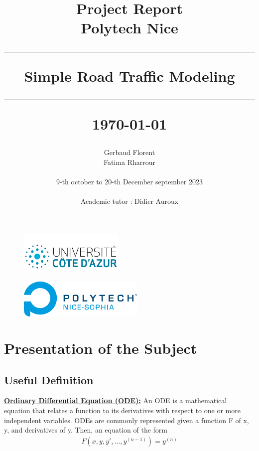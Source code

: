 \documentclass{article}
\title{\textbf{\Huge Project Report}\\[1cm]
	\textbf{\LARGE Polytech Nice}\\[2cm]
	\hrule height 1pt
	\vspace{0.5cm}
	\textbf{\Large Simple Road Traffic Modeling}\\[0.5cm]
	\hrule height 1pt
	\vspace{3cm}
	\small{\today{}}}
\author{
	\begin{tabular}{c}
		Gerbaud Florent \\ Fatima Rharrour \\ \\
		9-th october to 20-th December september 2023\\
		\\ Academic tutor : Didier Auroux
	\end{tabular}
}
\date{}
\begin{document}
	\maketitle
	\hspace{2cm}
	\begin{figure}[b]
		\centering
		\begin{minipage}[b]{0.45\linewidth}
			\includegraphics[width=5cm]{logo.png} \\
		\end{minipage}
		\hfill
		\begin{minipage}[b]{0.45\linewidth}
			\raggedleft
			\vspace{-0.5cm}
			\includegraphics[width=6cm]{Polytech.png} \\
		\end{minipage}
	\end{figure}
	\newpage %
	\renewcommand{\contentsname}{
		\hfill
		\begin{tikzpicture}
			\node[draw, fill=white, inner sep=20pt,line width=1.5pt] {\fontsize{30}{36}\selectfont\bfseries Table of Contents};
		\end{tikzpicture}
		\hfill
	}
	\tableofcontents
	\newpage
	\listoffigures %
	
	\listofalgorithms
	\newpage
	\section{Presentation of the Subject}
	\subsection{Useful Definition}
		\textbf{\underline{Ordinary Differential Equation (ODE):}} \newline\newline
		An ODE is a mathematical equation that relates a function to its derivatives with respect to one or more independent variables. ODEs are commonly represented given a function F of x, y, and derivatives of y. Then, an equation of the form
		\begin{align*}
			F\left(x,y,y',\ldots ,y^{(n-1)}\right)=y^{(n)}
		\end{align*}
		
\end{document}
